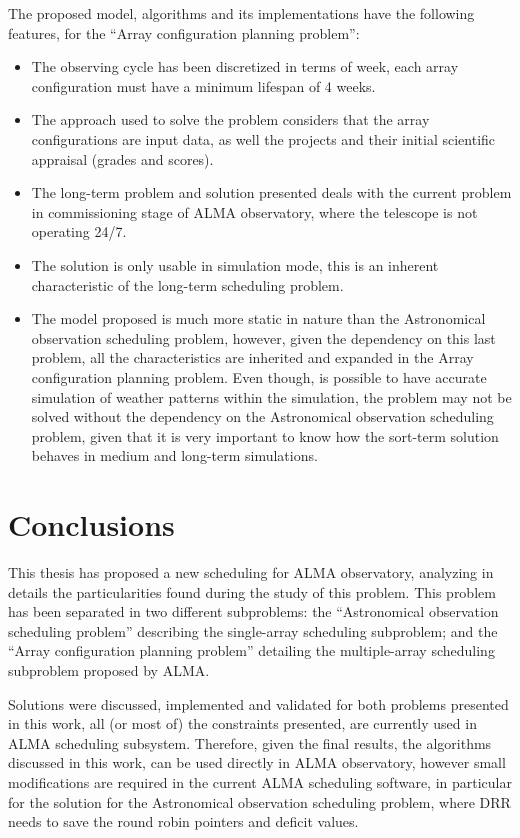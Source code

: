 The proposed model, algorithms and its implementations have the following features, for the ``Array configuration planning problem'':
\begin{itemize}
\item The observing cycle has been discretized in terms of week, each array configuration must have a minimum lifespan of 4 weeks.

\item The approach used to solve the problem considers that the array configurations are input data, as well the projects and their initial scientific appraisal (grades and scores).

\item The long-term problem and solution presented deals with the current problem in commissioning stage of ALMA observatory, where the telescope is not operating 24/7.

\item The solution is only usable in simulation mode, this is an inherent characteristic of the long-term scheduling problem.

\item The model proposed is much more static in nature than the Astronomical observation scheduling problem, however, given the dependency on this last problem, all the characteristics are inherited and expanded in the Array configuration planning problem. Even though, is possible to have accurate simulation of weather patterns within the simulation, the problem may not be solved without the dependency on the Astronomical observation scheduling problem, given that it is very important to know how the sort-term solution behaves in medium and long-term simulations.

\end{itemize}


\chapter{Conclusions}
This thesis has proposed a new scheduling for ALMA observatory, analyzing in details the particularities found during the study of this problem. This problem has been separated in two different subproblems: the ``Astronomical observation scheduling problem'' describing the single-array scheduling subproblem; and the ``Array configuration planning problem'' detailing the multiple-array scheduling subproblem proposed by ALMA.

Solutions were discussed, implemented and validated for both problems presented in this work, all (or most of) the constraints presented, are currently used in ALMA scheduling subsystem. Therefore, given the final results, the algorithms discussed in this work, can be used directly in ALMA observatory, however small modifications are required in the current ALMA scheduling software, in particular for the solution for the Astronomical observation scheduling problem, where DRR needs to save the round robin pointers and deficit values.

